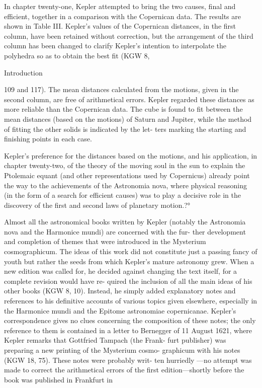 \documentclass{article}
\begin{document}
In chapter twenty-one, Kepler attempted to bring the two causes, final
and efficient, together in a comparison with the Copernican data. The
results are shown in Table III. Kepler’s values of the Copernican
distances, in the first column, have been retained without correction, but
the arrangement of the third column has been changed to clarify Kepler’s
intention to interpolate the polyhedra so as to obtain the best fit (KGW 8,


Introduction

109 and 117). The mean distances calculated from the motions, given in
the second column, are free of arithmetical errors. Kepler regarded these
distances as more reliable than the Copernican data. The cube is found to
fit between the mean distances (based on the motions) of Saturn and
Jupiter, while the method of fitting the other solids is indicated by the let-
ters marking the starting and finishing points in each case.

Kepler’s preference for the distances based on the motions, and his
application, in chapter twenty-two, of the theory of the moving soul in the
sun to explain the Ptolemaic equant (and other representations used by
Copernicus) already point the way to the achievements of the Astronomia
nova, where physical reasoning (in the form of a search for efficient
causes) was to play a decisive role in the discovery of the first and second
laws of planetary motion.?°

Almost all the astronomical books written by Kepler (notably the
Astronomia nova and the Harmonice mundi) are concerned with the fur-
ther development and completion of themes that were introduced in the
Mysterium cosmographicum. The ideas of this work did not constitute
just a passing fancy of youth but rather the seeds from which Kepler’s
mature astronomy grew. When a new edition was called for, he decided
against changing the text itself, for a complete revision would have re-
quired the inclusion of all the main ideas of his other books (KGW 8, 10).
Instead, he simply added explanatory notes and references to his
definitive accounts of various topics given elsewhere, especially in the
Harmonice mundi and the Epitome astronomiae copernicanae. Kepler’s
correspondence gives no clues concerning the composition of these notes;
the only reference to them is contained in a letter to Bernegger of 11
August 1621, where Kepler remarks that Gottfried Tampach (the Frank-
furt publisher) was preparing a new printing of the Mysterium cosmo-
graphicum with his notes (KGW 18, 75). These notes were probably writ-
ten hurriedly —no attempt was made to correct the arithmetical errors of
the first edition—shortly before the book was published in Frankfurt in
\end{document}
